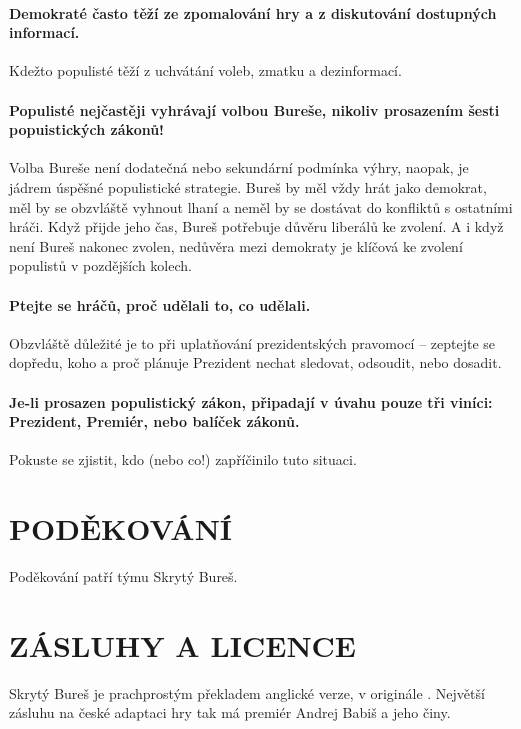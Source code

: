 \documentclass{article}
\begin{document}
        \paragraph{Demokraté často těží ze zpomalování hry a z diskutování dostupných informací.} Kdežto populisté těží z uchvátání voleb, zmatku a dezinformací.

        \paragraph{Populisté nejčastěji vyhrávají volbou Bureše, nikoliv prosazením šesti popuistických zákonů!} Volba Bureše není dodatečná nebo sekundární podmínka výhry, naopak, je jádrem úspěšné populistické strategie. Bureš by měl vždy hrát jako demokrat, měl by se obzvláště vyhnout lhaní a neměl by se dostávat do konfliktů s ostatními hráči. Když přijde jeho čas, Bureš potřebuje důvěru liberálů ke zvolení. A i když není Bureš nakonec zvolen, nedůvěra mezi demokraty je klíčová ke zvolení populistů v pozdějších kolech.

        \paragraph{Ptejte se hráčů, proč udělali to, co udělali.} Obzvláště důležité je to při uplatňování prezidentských pravomocí -- zeptejte se dopředu, koho a proč plánuje Prezident nechat sledovat, odsoudit, nebo dosadit. %

        \paragraph{Je-li prosazen populistický zákon, připadají v úvahu pouze tři viníci: Prezident, Premiér, nebo balíček zákonů.} Pokuste se zjistit, kdo (nebo co!) zapříčinilo tuto situaci.

    \section*{PODĚKOVÁNÍ}

        Poděkování patří týmu Skrytý Bureš.

    \section*{ZÁSLUHY A LICENCE}

        Skrytý Bureš je prachprostým překladem anglické verze, v originále . Největší zásluhu na české adaptaci hry tak má premiér Andrej Babiš a jeho činy.
\end{document}
